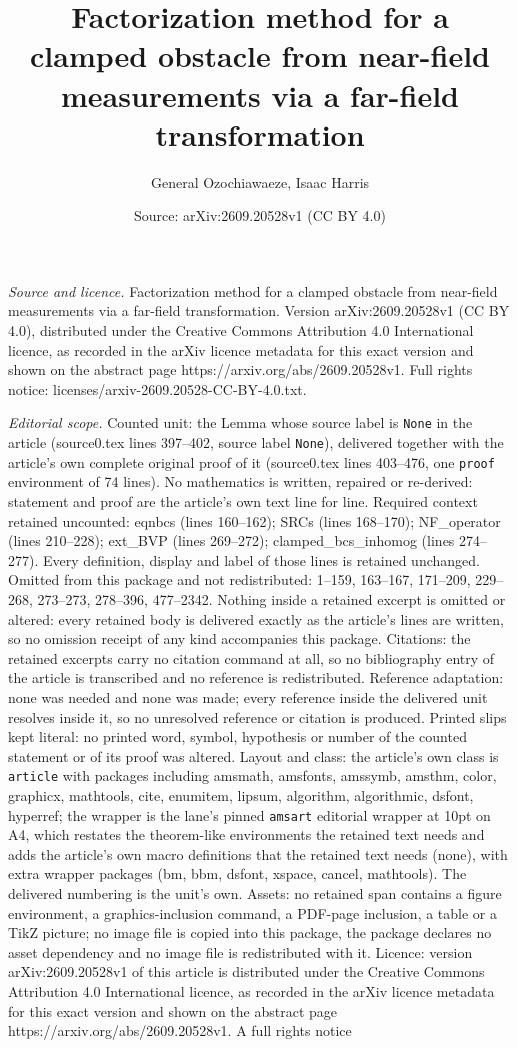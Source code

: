 \documentclass[10pt,a4paper]{amsart}
\title[Factorization method for a clamped obstacle from near-field ]{Factorization method for a clamped obstacle from near-field measurements via a far-field transformation}
\author{General Ozochiawaeze, Isaac Harris}
\date{Source: arXiv:2609.20528v1 (CC BY 4.0)}
\begin{document}
\maketitle

\noindent\emph{Source and licence.} Factorization method for a clamped obstacle from near-field measurements via a far-field transformation. Version arXiv:2609.20528v1 (CC BY 4.0), distributed under the Creative Commons Attribution 4.0 International licence, as recorded in the arXiv licence metadata for this exact version and shown on the abstract page https://arxiv.org/abs/2609.20528v1. Full rights notice: licenses/arxiv-2609.20528-CC-BY-4.0.txt.\par\smallskip

\noindent\textit{Editorial scope.} Counted unit: the Lemma whose source label is \texttt{None} in the article (source0.tex lines 397--402, source label \texttt{None}), delivered together with the article's own complete original proof of it (source0.tex lines 403--476, one \texttt{proof} environment of 74 lines). No mathematics is written, repaired or re-derived: statement and proof are the article's own text line for line. Required context retained uncounted: eqnbcs (lines 160--162); SRCs (lines 168--170); NF\_operator (lines 210--228); ext\_BVP (lines 269--272); clamped\_bcs\_inhomog (lines 274--277). Every definition, display and label of those lines is retained unchanged. Omitted from this package and not redistributed: 1--159, 163--167, 171--209, 229--268, 273--273, 278--396, 477--2342. Nothing inside a retained excerpt is omitted or altered: every retained body is delivered exactly as the article's lines are written, so no omission receipt of any kind accompanies this package. Citations: the retained excerpts carry no citation command at all, so no bibliography entry of the article is transcribed and no reference is redistributed. Reference adaptation: none was needed and none was made; every reference inside the delivered unit resolves inside it, so no unresolved reference or citation is produced. Printed slips kept literal: no printed word, symbol, hypothesis or number of the counted statement or of its proof was altered. Layout and class: the article's own class is \texttt{article} with packages including amsmath, amsfonts, amssymb, amsthm, color, graphicx, mathtools, cite, enumitem, lipsum, algorithm, algorithmic, dsfont, hyperref; the wrapper is the lane's pinned \texttt{amsart} editorial wrapper at 10pt on A4, which restates the theorem-like environments the retained text needs and adds the article's own macro definitions that the retained text needs (none), with extra wrapper packages (bm, bbm, dsfont, xspace, cancel, mathtools). The delivered numbering is the unit's own. Assets: no retained span contains a figure environment, a graphics-inclusion command, a PDF-page inclusion, a table or a TikZ picture; no image file is copied into this package, the package declares no asset dependency and no image file is redistributed with it. Licence: version arXiv:2609.20528v1 of this article is distributed under the Creative Commons Attribution 4.0 International licence, as recorded in the arXiv licence metadata for this exact version and shown on the abstract page https://arxiv.org/abs/2609.20528v1. A full rights notice 
\end{document}
